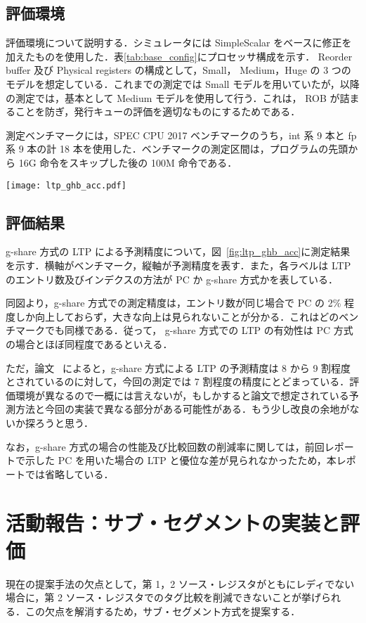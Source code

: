 \documentclass[twocolumn]{jsarticle}
\begin{document}
  \subsection{評価環境}
  評価環境について説明する．シミュレータには SimpleScalar をベースに修正を加えたものを使用した．表\ref{tab:base_config}にプロセッサ構成を示す． Reorder buffer 及び Physical registers の構成として，Small， Medium，Huge の 3 つのモデルを想定している．これまでの測定では Small モデルを用いていたが，以降の測定では，基本として Medium モデルを使用して行う．これは， ROB が詰まることを防ぎ，発行キューの評価を適切なものにするためである． 
  
  測定ベンチマークには，SPEC CPU 2017 ベンチマークのうち，int 系 9 本と fp 系 9 本の計 18 本を使用した．ベンチマークの測定区間は，プログラムの先頭から 16G 命令をスキップした後の 100M 命令である．

 \begin{figure*}[ht]
    \centering
    \texttt{[image: ltp\_ghb\_acc.pdf]}
    \caption{LTP の予測精度}
    \label{fig:ltp_ghb_acc}
  \end{figure*}

  \subsection{評価結果}
  g-share 方式の LTP による予測精度について，図~\ref{fig:ltp_ghb_acc}に測定結果を示す．横軸がベンチマーク，縦軸が予測精度を表す．また，各ラベルは LTP のエントリ数及びインデクスの方法が PC か g-share 方式かを表している．

  同図より，g-share 方式での測定精度は，エントリ数が同じ場合で PC の 2\% 程度しか向上しておらず，大きな向上は見られないことが分かる．これはどのベンチマークでも同様である．従って， g-share 方式での LTP の有効性は PC 方式の場合とほぼ同程度であるといえる．

  ただ，論文~\cite{ernst2002} によると，g-share 方式による LTP の予測精度は 8 から 9 割程度とされているのに対して，今回の測定では 7 割程度の精度にとどまっている．評価環境が異なるので一概には言えないが，もしかすると論文で想定されている予測方法と今回の実装で異なる部分がある可能性がある．もう少し改良の余地がないか探ろうと思う．

  なお，g-share 方式の場合の性能及び比較回数の削減率に関しては，前回レポートで示した PC を用いた場合の LTP と優位な差が見られなかったため，本レポートでは省略している．

  \section{活動報告：サブ・セグメントの実装と評価}
  現在の提案手法の欠点として，第 1，2 ソース・レジスタがともにレディでない場合に，第 2 ソース・レジスタでのタグ比較を削減できないことが挙げられる．この欠点を解消するため，サブ・セグメント方式を提案する．
\end{document}
